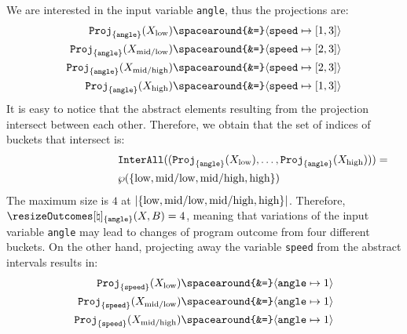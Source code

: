 \begin{example}
  We are interested in the input variable \texttt{angle}, thus the projections are:
  \begin{align*}
    \abstractdomainproject[{\{\texttt{angle}\}}](\prefrombucket[\textup{low}]) \spacearound{&=} \langle \texttt{speed} \mapsto [1, 3] \rangle \\
    \abstractdomainproject[{\{\texttt{angle}\}}](\prefrombucket[\textup{mid\-/low}]) \spacearound{&=} \langle \texttt{speed} \mapsto [2, 3] \rangle \\
    \abstractdomainproject[{\{\texttt{angle}\}}](\prefrombucket[\textup{mid\-/high}]) \spacearound{&=} \langle \texttt{speed} \mapsto [2, 3] \rangle \\
    \abstractdomainproject[{\{\texttt{angle}\}}](\prefrombucket[\textup{high}]) \spacearound{&=} \langle \texttt{speed} \mapsto [1, 3] \rangle \\
  \end{align*}
  It is easy to notice that the abstract elements resulting from the projection intersect between each other. Therefore, we obtain that the set of indices of buckets that intersect is:
  \begin{eqnarray*}
  \lefteqn{\intersectallfunction((\abstractdomainproject[{\{\texttt{angle}\}}](\prefrombucket[\textup{low}]), \dots, \abstractdomainproject[{\{\texttt{angle}\}}](\prefrombucket[\textup{high}]))) ={}} \\
& \setof{\{\textup{low}, \textup{mid\-/low}, \textup{mid\-/high}, \textup{high}\}}
\end{eqnarray*}
  The maximum size is $4$ at $|\{\textup{low}, \textup{mid\-/low}, \textup{mid\-/high}, \textup{high}\}|$.
  Therefore, $\abstractoutcomesname_{\{\texttt{angle}\}}(\presfrombuckets, \buckets) = 4$, meaning that variations of the input variable \texttt{angle} may lead to changes of program outcome from four different buckets.
  On the other hand, projecting away the variable \texttt{speed} from the abstract intervals results in:
  \begin{align*}
    \abstractdomainproject[{\{\texttt{speed}\}}](\prefrombucket[\textup{low}]) \spacearound{&=} \langle \texttt{angle} \mapsto 1 \rangle \\
    \abstractdomainproject[{\{\texttt{speed}\}}](\prefrombucket[\textup{mid\-/low}]) \spacearound{&=} \langle \texttt{angle} \mapsto 1 \rangle \\
    \abstractdomainproject[{\{\texttt{speed}\}}](\prefrombucket[\textup{mid\-/high}]) \spacearound{&=} \langle \texttt{angle} \mapsto 1 \rangle \\

\end{align*}
\end{example}
